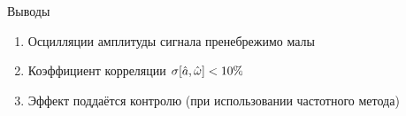 \documentclass[14pt]{beamer}
\begin{document}
\begin{frame}\centering
{}
\end{frame}

\begin{frame}{Выводы}
\begin{enumerate}
\item Осцилляции амплитуды сигнала пренебрежимо малы
\item Коэффициент корреляции $\sigma[\hat a, \hat{\omega}] < 10\%$
\item Эффект поддаётся контролю (при использовании частотного метода)
\end{enumerate}
\end{frame}



\end{document}
